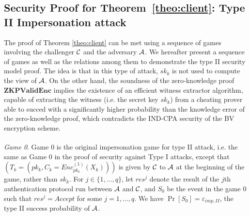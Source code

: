 \subsection{Security Proof for Theorem~\ref{theo:client}: Type II Impersonation attack}
\label{append:ProofsTypeII}
The proof of Theorem \ref{theo:client} can be met using a sequence of games involving the challenger $\mathcal{C}$ and the adversary $\mathcal{A}$. We hereafter present
a sequence of games as well as the relations among them to demonstrate the type II security model proof. The idea is that in this type of attack, $sk_k$ is not used to compute the view of $\mathcal{A}$. On the other hand, the soundness of the zero-knowledge proof $\mathbf{ZKPValidEnc}$ implies the existence of an efficient witness extractor algorithm, capable of extracting the witness (i.e. the secret key $sk_k$) from a cheating prover able to succed with a significantly higher probability than the knowledge error of the zero-knowledge proof, which contradicts the IND-CPA security of the BV encryption scheme. \\\\
\textit{Game 0}. Game 0 is the original impersonation game for type II attack, i.e. the same as Game 0 in the proof of security against Type I attacks, except that $(T_k =(pk_k, C_k = Enc^{(1)}_{pk_k}(X_k)))$ is given by $\mathcal{C}$ to $\mathcal{A}$ at the beginning of the game, rather than $sk_k$.
For $j \in \{1,\ldots,q\}$, let $res^{j}$ denote the result of the $j$th authentication protocol run between $\mathcal{A}$ and $\mathcal{C}$, and $S_0$ be
the event in the game $0$ such that $res^{j} = Accept$ for some $j=1,\ldots,q$. We have $\Pr[S_0] = \varepsilon_{imp,II}$, the type II success probability of $\mathcal{A}$. \\\\
